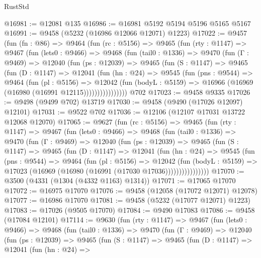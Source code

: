 \begin{lexlean}{RustStd}
\begin{coremodule}
@16981 := @12081 @135
@16986 := @16981 @5192 @5194 @5196 @5165 @5167
@16991 := @9458 (@5232 (@16986 @12066 @12071) @1223)
@17022 := @9457
    (fun (fn : @86) =>
    @9464
      (fun (rc : @5156) =>
      @9465
        (fun (rty : @1147) =>
        @9467
          (fun (lets0 : @9466) =>
          @9468
            (fun (tail0 : @1336) =>
            @9470
              (fun (Γ : @9469) =>
              @12040
                (fun (ps : @12039) =>
                @9465
                  (fun (S : @1147) =>
                  @9465
                    (fun (D : @1147) =>
                    @12041
                      (fun (hn : @24) =>
                      @9545
                        (fun (pns : @9544) =>
                        @9464
                          (fun (pl : @5156) =>
                          @12042
                            (fun (bodyL : @5159) =>
                            @16966 (@16969 (@16980 (@16991 @12115))))))))))))))))
    @702
@17023 := @9458 @9335
@17026 := @9498 (@9499 @702) @13719
@17030 := @9458 (@9490 (@17026 @12097) @12101)
@17031 := @9522 @702
@17036 := @12106 (@12107 @17031 @13722 @12068 @12070)
@17065 := @9627
    (fun (rc : @5156) =>
    @9465
      (fun (rty : @1147) =>
      @9467
        (fun (lets0 : @9466) =>
        @9468
          (fun (tail0 : @1336) =>
          @9470
            (fun (Γ : @9469) =>
            @12040
              (fun (ps : @12039) =>
              @9465
                (fun (S : @1147) =>
                @9465
                  (fun (D : @1147) =>
                  @12041
                    (fun (hn : @24) =>
                    @9545
                      (fun (pns : @9544) =>
                      @9464
                        (fun (pl : @5156) =>
                        @12042
                          (fun (bodyL : @5159) =>
                          @17023 (@16969 (@16980 (@16991 (@17030 @17036))))))))))))))))
@17070 := @3500 (@4331 (@1304 (@4332 @1163) @1314))
@17071 := @17065 @17070
@17072 := @16975 @17070
@17076 := @9458 (@12058 (@17072 @12071) @12078)
@17077 := @16986 @17070
@17081 := @9458 (@5232 (@17077 @12071) @1223)
@17083 := @17026 (@9505 @17070)
@17084 := @9490 @17083
@17086 := @9458 (@17084 @12101)
@17114 := @9630
    (fun (rty : @1147) =>
    @9467
      (fun (lets0 : @9466) =>
      @9468
        (fun (tail0 : @1336) =>
        @9470
          (fun (Γ : @9469) =>
          @12040
            (fun (ps : @12039) =>
            @9465
              (fun (S : @1147) =>
              @9465
                (fun (D : @1147) =>
                @12041
                  (fun (hn : @24) =>

\end{coremodule}
\end{lexlean}
